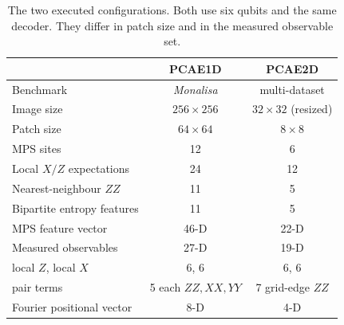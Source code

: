 \documentclass[pdflatex,sn-basic]{sn-jnl}
\begin{document}
\begin{table}[t]
	\centering
	\caption{The two executed configurations.
	Both use six qubits and the same decoder.
	They differ in patch size and in the measured observable set.}
	\label{tab:configurations}
	\begin{tabular}{@{}l c c@{}}
		\toprule
		& PCAE1D                 & PCAE2D                  \\
		\midrule
		Benchmark                     & \textit{Monalisa}     & multi-dataset          \\
		Image size                    & $256\times256$        & $32\times32$ (resized)  \\
		Patch size                    & $64\times64$          & $8\times8$             \\
		MPS sites                     & 12                    & 6                      \\
		Local $X/Z$ expectations      & 24                    & 12                     \\
		Nearest-neighbour $ZZ$        & 11                    & 5                      \\
		 Bipartite entropy features           & 11                   & 5                      \\
		MPS feature vector            & 46-D                  & 22-D                   \\
		\midrule
		Measured observables          & 27-D                  & 19-D                   \\
		\quad local $Z$, local $X$    & 6, 6                  & 6, 6                   \\
		\quad pair terms              & 5 each $ZZ,XX,YY$     & 7 grid-edge $ZZ$       \\
		Fourier positional vector     & 8-D                   & 4-D                    \\
		\bottomrule
	\end{tabular}
\end{table}
\end{document}
